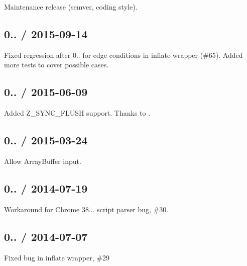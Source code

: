 \begin{DoxyItemize}
\item Maintenance release (semver, coding style).
\end{DoxyItemize}

\subsection*{0.. / 2015-\/09-\/14 }


\begin{DoxyItemize}
\item Fixed regression after 0.. for edge conditions in inflate wrapper (\#65). Added more tests to cover possible cases.
\end{DoxyItemize}

\subsection*{0.. / 2015-\/06-\/09 }


\begin{DoxyItemize}
\item Added Z\+\_\+\+S\+Y\+N\+C\+\_\+\+F\+L\+U\+SH support. Thanks to .
\end{DoxyItemize}

\subsection*{0.. / 2015-\/03-\/24 }


\begin{DoxyItemize}
\item Allow Array\+Buffer input.
\end{DoxyItemize}

\subsection*{0.. / 2014-\/07-\/19 }


\begin{DoxyItemize}
\item Workaround for Chrome 38... script parser bug, \#30.
\end{DoxyItemize}

\subsection*{0.. / 2014-\/07-\/07 }


\begin{DoxyItemize}
\item Fixed bug in inflate wrapper, \#29
\end{DoxyItemize}

